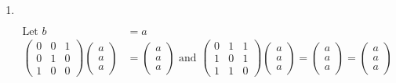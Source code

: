 \begin{enumerate}
	\begin{answer}
		\begin{align*}
		M&=\left(\begin{array}{ccc}0 & 2 i & 3 i \\ -2 i & 0 & 6 i \\ -3 i & -6 i & 0\end{array}\right), M^{+}=\left(\begin{array}{ccc}0 & 2 i & 3 i \\ -2 i & 0 & 6 i \\ -3 i & -6 i & 0\end{array}\right)\\
		&M^{+}=M
	\intertext{	Matrix is Hermitian so roots are real and trace $=0$.}
		&\lambda_{1}+\lambda_{2}+\lambda_{3}=0, \lambda_{1} \cdot \lambda_{2} \cdot \lambda_{3}=0 \Rightarrow \lambda=-7,0,7
		\end{align*}
			So the correct answer is \textbf{Option (b)}
	\end{answer}
	\item $\left. \right. $		
	\begin{answer}
		\begin{align*}
		\text{Let }b&=a\\
		\left(\begin{array}{lll}0 & 0 & 1 \\ 0 & 1 & 0 \\ 1 & 0 & 0\end{array}\right)\left(\begin{array}{l}a \\ a \\ a\end{array}\right)&=\left(\begin{array}{l}a \\ a \\ a\end{array}\right)\text{ and }\left(\begin{array}{lll}0 & 1 & 1 \\ 1 & 0 & 1 \\ 1 & 1 & 0\end{array}\right)\left(\begin{array}{l}a \\ a \\ a\end{array}\right)=\left(\begin{array}{l}a \\ a \\ a\end{array}\right)=\left(\begin{array}{l}a \\ a \\ a\end{array}\right)\\

\end{align*}
\end{answer}
\end{enumerate}
